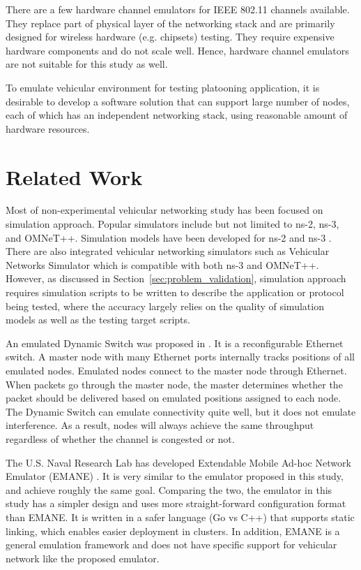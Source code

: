 \documentclass[12pt]{report}
\begin{document}
There are a few hardware channel emulators for IEEE 802.11 channels available. They replace part of physical layer of the networking stack and are primarily designed for wireless hardware (e.g. chipsets) testing. They require expensive hardware components and do not scale well. Hence, hardware channel emulators are not suitable for this study as well.

To emulate vehicular environment for testing platooning application, it is desirable to develop a software solution that can support large number of nodes, each of which has an independent networking stack, using reasonable amount of hardware resources.


\section{Related Work}

Most of non-experimental vehicular networking study has been focused on simulation approach. Popular simulators include but not limited to ns-2, ns-3\cite{henderson2008network}, and OMNeT++\cite{varga2008overview}. Simulation models have been developed for ns-2 \cite{Chen2006ns2} and ns-3 \cite{Arbabi2010ns3,benin2012ns3}. There are also integrated vehicular networking simulators such as Vehicular Networks Simulator \cite{fernandes2012} which is compatible with both ns-3 and OMNeT++. However, as discussed in Section~\ref{sec:problem_validation}, simulation approach requires simulation scripts to be written to describe the application or protocol being tested, where the accuracy largely relies on the quality of simulation models as well as the testing target scripts.

An emulated Dynamic Switch was proposed in \cite{lin2004mobile}. It is a reconfigurable Ethernet switch. A master node with many Ethernet ports internally tracks positions of all emulated nodes. Emulated nodes connect to the master node through Ethernet. When packets go through the master node, the master determines whether the packet should be delivered based on emulated positions assigned to each node. The Dynamic Switch can emulate connectivity quite well, but it does not emulate interference. As a result, nodes will always achieve the same throughput regardless of whether the channel is congested or not.

The U.S. Naval Research Lab has developed Extendable Mobile Ad-hoc Network Emulator (EMANE) \cite{EMANE}. It is very similar to the emulator proposed in this study, and achieve roughly the same goal. Comparing the two, the emulator in this study has a simpler design and uses more straight-forward configuration format than EMANE. It is written in a safer language (Go vs C++) that supports static linking, which enables easier deployment in clusters. In addition, EMANE is a general emulation framework and does not have specific support for vehicular network like the proposed emulator.
\end{document}
